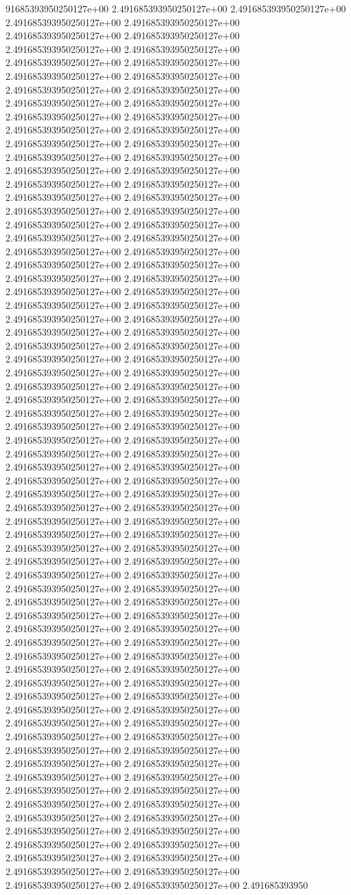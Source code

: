 91685393950250127e+00	2.491685393950250127e+00	2.491685393950250127e+00	2.491685393950250127e+00	2.491685393950250127e+00	2.491685393950250127e+00	2.491685393950250127e+00	2.491685393950250127e+00	2.491685393950250127e+00	2.491685393950250127e+00	2.491685393950250127e+00	2.491685393950250127e+00	2.491685393950250127e+00	2.491685393950250127e+00	2.491685393950250127e+00	2.491685393950250127e+00	2.491685393950250127e+00	2.491685393950250127e+00	2.491685393950250127e+00	2.491685393950250127e+00	2.491685393950250127e+00	2.491685393950250127e+00	2.491685393950250127e+00	2.491685393950250127e+00	2.491685393950250127e+00	2.491685393950250127e+00	2.491685393950250127e+00	2.491685393950250127e+00	2.491685393950250127e+00	2.491685393950250127e+00	2.491685393950250127e+00	2.491685393950250127e+00	2.491685393950250127e+00	2.491685393950250127e+00	2.491685393950250127e+00	2.491685393950250127e+00	2.491685393950250127e+00	2.491685393950250127e+00	2.491685393950250127e+00	2.491685393950250127e+00	2.491685393950250127e+00	2.491685393950250127e+00	2.491685393950250127e+00	2.491685393950250127e+00	2.491685393950250127e+00	2.491685393950250127e+00	2.491685393950250127e+00	2.491685393950250127e+00	2.491685393950250127e+00	2.491685393950250127e+00	2.491685393950250127e+00	2.491685393950250127e+00	2.491685393950250127e+00	2.491685393950250127e+00	2.491685393950250127e+00	2.491685393950250127e+00	2.491685393950250127e+00	2.491685393950250127e+00	2.491685393950250127e+00	2.491685393950250127e+00	2.491685393950250127e+00	2.491685393950250127e+00	2.491685393950250127e+00	2.491685393950250127e+00	2.491685393950250127e+00	2.491685393950250127e+00	2.491685393950250127e+00	2.491685393950250127e+00	2.491685393950250127e+00	2.491685393950250127e+00	2.491685393950250127e+00	2.491685393950250127e+00	2.491685393950250127e+00	2.491685393950250127e+00	2.491685393950250127e+00	2.491685393950250127e+00	2.491685393950250127e+00	2.491685393950250127e+00	2.491685393950250127e+00	2.491685393950250127e+00	2.491685393950250127e+00	2.491685393950250127e+00	2.491685393950250127e+00	2.491685393950250127e+00	2.491685393950250127e+00	2.491685393950250127e+00	2.491685393950250127e+00	2.491685393950250127e+00	2.491685393950250127e+00	2.491685393950250127e+00	2.491685393950250127e+00	2.491685393950250127e+00	2.491685393950250127e+00	2.491685393950250127e+00	2.491685393950250127e+00	2.491685393950250127e+00	2.491685393950250127e+00	2.491685393950250127e+00	2.491685393950250127e+00	2.491685393950250127e+00	2.491685393950250127e+00	2.491685393950250127e+00	2.491685393950250127e+00	2.491685393950250127e+00	2.491685393950250127e+00	2.491685393950250127e+00	2.491685393950250127e+00	2.491685393950250127e+00	2.491685393950250127e+00	2.491685393950250127e+00	2.491685393950250127e+00	2.491685393950250127e+00	2.491685393950250127e+00	2.491685393950250127e+00	2.491685393950250127e+00	2.491685393950250127e+00	2.491685393950250127e+00	2.491685393950250127e+00	2.491685393950250127e+00	2.491685393950250127e+00	2.491685393950250127e+00	2.491685393950250127e+00	2.491685393950250127e+00	2.491685393950250127e+00	2.491685393950250127e+00	2.491685393950250127e+00	2.491685393950250127e+00	2.491685393950250127e+00	2.491685393950250127e+00	2.491685393950250127e+00	2.491685393950250127e+00	2.491685393950250127e+00	2.491685393950250127e+00	2.491685393950